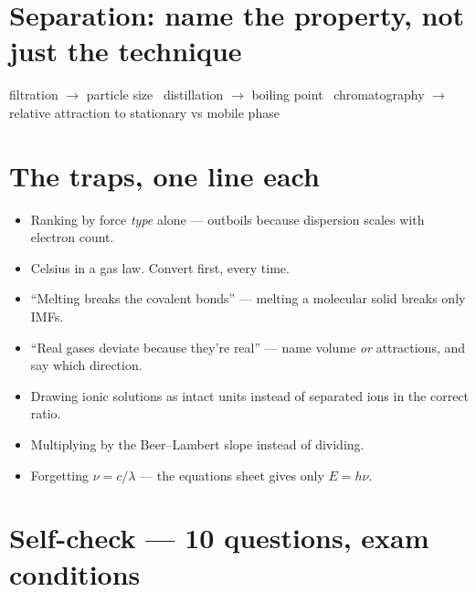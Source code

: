 \documentclass{apchem-worksheet}
\begin{document}
\section*{\sffamily Separation: name the property, not just the technique}

filtration $\to$ particle size \textbullet\ distillation $\to$ boiling point
\textbullet\ chromatography $\to$ relative attraction to stationary vs
mobile phase

\section*{\sffamily The traps, one line each}

\begin{itemize}[leftmargin=*,itemsep=0.22em]
  \item Ranking by force \emph{type} alone ---  outboils 
        because dispersion scales with electron count.
  \item Celsius in a gas law. Convert first, every time.
  \item ``Melting breaks the covalent bonds'' --- melting a molecular solid
        breaks only IMFs.
  \item ``Real gases deviate because they're real'' --- name volume
        \emph{or} attractions, and say which direction.
  \item Drawing ionic solutions as intact units instead of separated ions
        in the correct ratio.
  \item Multiplying by the Beer--Lambert slope instead of dividing.
  \item Forgetting $\nu = c/\lambda$ --- the equations sheet gives only
        $E = h\nu$.
\end{itemize}

\section*{\sffamily Self-check --- 10 questions, exam conditions}
\end{document}
